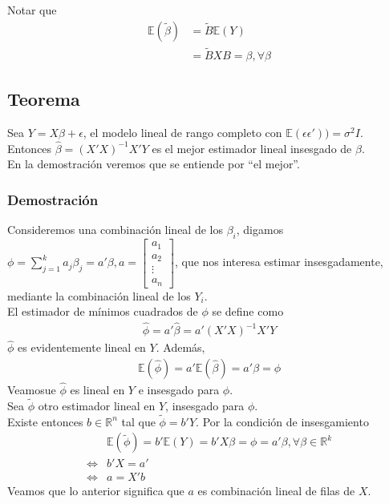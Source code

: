 \documentclass[10pt]{article}
\theoremstyle{plain}
\theoremstyle{definition}
\begin{document}
Notar que
\begin{align*}
\mathbb{E}(\tilde{\beta})&= \tilde{B}\mathbb{E}(Y)\\
&= \tilde{B}XB = \beta, \forall \beta
\end{align*}

\subsection{Teorema}
Sea $Y=X\beta + \epsilon$, el modelo lineal de rango completo con $\mathbb{E}(\epsilon\epsilon')) = \sigma^2 I$.\\
Entonces $\hat{\beta} = (X'X)^{-1}X'Y$ es el mejor estimador lineal insesgado de $\beta$.\\
En la demostración veremos que se entiende por ``el mejor''.
\subsubsection{Demostración}
Consideremos una combinación lineal de los $\beta_{i}$, digamos $\phi = \sum_{j=1}^{k}a_{j}\beta_{j} = a'\beta, a =\begin{bmatrix}
           a_{1} \\
           a_{2} \\
           \vdots \\
           a_{n}
         \end{bmatrix}$, que nos interesa estimar insesgadamente, mediante la combinación lineal de los $Y_{i}$.\\
         
El estimador de mínimos cuadrados de $\phi$ se define como
\begin{align*}
\hat{\phi} = a'\hat{\beta} = a'(X'X)^{-1}X'Y
\end{align*}
$\hat{\phi}$ es evidentemente lineal en $Y$. Además,
\begin{align*}
\mathbb{E}(\hat{\phi}) = a' \mathbb{E} (\hat{\beta}) = a' \beta = \phi
\end{align*}
Veamosue $\hat{\phi}$ es lineal en $Y$ e insesgado para $\phi$.\\

Sea $\tilde{\phi}$ otro estimador lineal en $Y$, insesgado para $\phi$.\\
Existe entonces $b\in\mathbb{R}^n$ tal que $\tilde{\phi} = b'Y$. Por la condición de insesgamiento
\begin{align*}
& \mathbb{E}(\tilde{\phi}) = b'\mathbb{E}(Y) = b'X\beta = \phi = a'\beta, \forall \beta \in \mathbb{R}^{k}\\
\Leftrightarrow & b'X = a'\\
\Leftrightarrow & a = X'b
\end{align*}
Veamos que lo anterior significa que $a$ es combinación lineal de filas de $X$.\\
\end{document}
